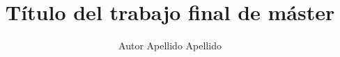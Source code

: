 \documentclass[a4paper,12pt,twoside,hidelinks,openright]{report}
\begin{document}
\title{Título del trabajo final de máster}
\author{Autor Apellido Apellido}

\pagebreak
\cleardoublepage
\baselineskip 19pt

\renewcommand{\labelitemi}{$-$}
\renewcommand{\tablename}{Tabla}

\renewcommand{\appendixname}{Anexos}
\renewcommand{\appendixtocname}{Anexos}
\renewcommand{\appendixpagename}{Anexos}





\cleardoublepage



\newpage


\newpage
\cleardoublepage

\newpage

\cleardoublepage
\renewcommand{\contentsname}{Índice}
\tableofcontents











\nocite{*} 

\newpage
\renewcommand\listfigurename{Lista de Figuras}
\listoffigures

\newpage
\renewcommand\listtablename{Lista de Tablas}
\listoftables


\newpage
\appendix
\clearpage
\addappheadtotoc
\appendixpage



\end{document}
